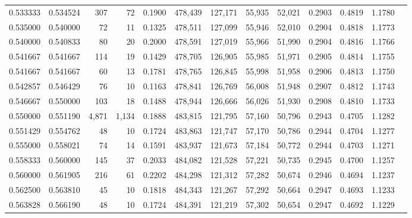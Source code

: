 \begin{tabular}{rrrrrrrrrrrrr}
0.533333 & 0.534524 &    307 &     72 &                                     0.1900 & 478,439 & 127,171 &  55,935 &  52,021 & 0.2903 & 0.4819 & 1.1780 \\
0.535000 & 0.540000 &     72 &     11 &                                     0.1325 & 478,511 & 127,099 &  55,946 &  52,010 & 0.2904 & 0.4818 & 1.1773 \\
0.540000 & 0.540833 &     80 &     20 &                                     0.2000 & 478,591 & 127,019 &  55,966 &  51,990 & 0.2904 & 0.4816 & 1.1766 \\
0.541667 & 0.541667 &    114 &     19 &                                     0.1429 & 478,705 & 126,905 &  55,985 &  51,971 & 0.2905 & 0.4814 & 1.1755 \\
0.541667 & 0.541667 &     60 &     13 &                                     0.1781 & 478,765 & 126,845 &  55,998 &  51,958 & 0.2906 & 0.4813 & 1.1750 \\
0.542857 & 0.546429 &     76 &     10 &                                     0.1163 & 478,841 & 126,769 &  56,008 &  51,948 & 0.2907 & 0.4812 & 1.1743 \\
0.546667 & 0.550000 &    103 &     18 &                                     0.1488 & 478,944 & 126,666 &  56,026 &  51,930 & 0.2908 & 0.4810 & 1.1733 \\
0.550000 & 0.551190 &  4,871 &  1,134 &                                     0.1888 & 483,815 & 121,795 &  57,160 &  50,796 & 0.2943 & 0.4705 & 1.1282 \\
0.551429 & 0.554762 &     48 &     10 &                                     0.1724 & 483,863 & 121,747 &  57,170 &  50,786 & 0.2944 & 0.4704 & 1.1277 \\
0.555000 & 0.558021 &     74 &     14 &                                     0.1591 & 483,937 & 121,673 &  57,184 &  50,772 & 0.2944 & 0.4703 & 1.1271 \\
0.558333 & 0.560000 &    145 &     37 &                                     0.2033 & 484,082 & 121,528 &  57,221 &  50,735 & 0.2945 & 0.4700 & 1.1257 \\
0.560000 & 0.561905 &    216 &     61 &                                     0.2202 & 484,298 & 121,312 &  57,282 &  50,674 & 0.2946 & 0.4694 & 1.1237 \\
0.562500 & 0.563810 &     45 &     10 &                                     0.1818 & 484,343 & 121,267 &  57,292 &  50,664 & 0.2947 & 0.4693 & 1.1233 \\
0.563828 & 0.566190 &     48 &     10 &                                     0.1724 & 484,391 & 121,219 &  57,302 &  50,654 & 0.2947 & 0.4692 & 1.1229 \\

\end{tabular}
